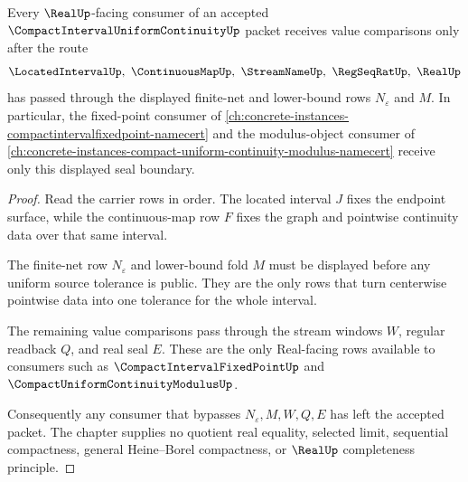 \begin{theorem}
\label{thm:compact-interval-uniform-continuity-real-seal}
Every $\RealUp$-facing consumer of an accepted
$\CompactIntervalUniformContinuityUp$ packet receives value comparisons only
after the route
$$
\LocatedIntervalUp,\ \ContinuousMapUp,\ \StreamNameUp,\ \RegSeqRatUp,\ \RealUp
$$
has passed through the displayed finite-net and lower-bound rows
$N_\varepsilon$ and $M$. In particular, the fixed-point consumer of
\autoref{ch:concrete-instances-compactintervalfixedpoint-namecert} and the
modulus-object consumer of
\autoref{ch:concrete-instances-compact-uniform-continuity-modulus-namecert}
receive only this displayed seal boundary.
\end{theorem}
\begin{proof}
Read the carrier rows in order. The located interval $J$ fixes the endpoint
surface, while the continuous-map row $F$ fixes the graph and pointwise
continuity data over that same interval.

The finite-net row $N_\varepsilon$ and lower-bound fold $M$ must be displayed
before any uniform source tolerance is public. They are the only rows that
turn centerwise pointwise data into one tolerance for the whole interval.

The remaining value comparisons pass through the stream windows $W$, regular
readback $Q$, and real seal $E$. These are the only Real-facing rows available
to consumers such as $\CompactIntervalFixedPointUp$ and
$\CompactUniformContinuityModulusUp$.

Consequently any consumer that bypasses $N_\varepsilon,M,W,Q,E$ has left the
accepted packet. The chapter supplies no quotient real equality, selected
limit, sequential compactness, general Heine--Borel compactness, or
$\RealUp$ completeness principle.
\end{proof}

